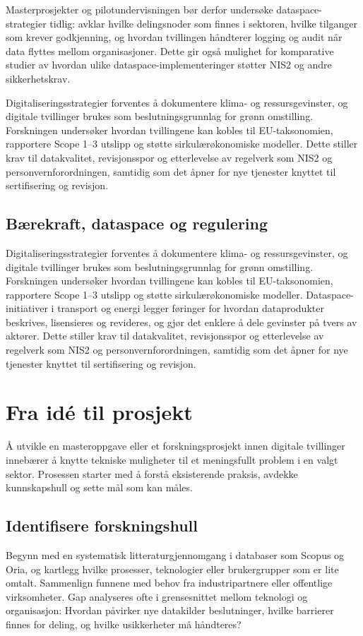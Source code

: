 Masterprosjekter og pilotundervisningen bør derfor undersøke dataspace-strategier tidlig: avklar hvilke delingsnoder som finnes i sektoren, hvilke tilganger som krever godkjenning, og hvordan tvillingen håndterer logging og audit når data flyttes mellom organisasjoner. Dette gir også mulighet for komparative studier av hvordan ulike dataspace-implementeringer støtter NIS2 og andre sikkerhetskrav.

Digitaliseringsstrategier forventes å dokumentere klima- og ressursgevinster, og digitale tvillinger brukes som beslutningsgrunnlag for grønn omstilling. Forskningen undersøker hvordan tvillingene kan kobles til EU-taksonomien, rapportere Scope 1–3 utslipp og støtte sirkulærøkonomiske modeller. Dette stiller krav til datakvalitet, revisjonsspor og etterlevelse av regelverk som NIS2 og personvernforordningen, samtidig som det åpner for nye tjenester knyttet til sertifisering og revisjon.
\subsection{Bærekraft, dataspace og regulering}
Digitaliseringsstrategier forventes å dokumentere klima- og ressursgevinster, og digitale tvillinger brukes som beslutningsgrunnlag for grønn omstilling. Forskningen undersøker hvordan tvillingene kan kobles til EU-taksonomien, rapportere Scope 1–3 utslipp og støtte sirkulærøkonomiske modeller. Dataspace-initiativer i transport og energi legger føringer for hvordan dataprodukter beskrives, lisensieres og revideres, og gjør det enklere å dele gevinster på tvers av aktører.\citep{ec2023mobilitydataspace,idsa2023ram} Dette stiller krav til datakvalitet, revisjonsspor og etterlevelse av regelverk som NIS2 og personvernforordningen, samtidig som det åpner for nye tjenester knyttet til sertifisering og revisjon.

\section{Fra idé til prosjekt}
Å utvikle en masteroppgave eller et forskningsprosjekt innen digitale tvillinger innebærer å knytte tekniske muligheter til et meningsfullt problem i en valgt sektor. Prosessen starter med å forstå eksisterende praksis, avdekke kunnskapshull og sette mål som kan måles.

\subsection{Identifisere forskningshull}
Begynn med en systematisk litteraturgjennomgang i databaser som Scopus og Oria, og kartlegg hvilke prosesser, teknologier eller brukergrupper som er lite omtalt. Sammenlign funnene med behov fra industripartnere eller offentlige virksomheter. Gap analyseres ofte i grensesnittet mellom teknologi og organisasjon: Hvordan påvirker nye datakilder beslutninger, hvilke barrierer finnes for deling, og hvilke usikkerheter må håndteres?

